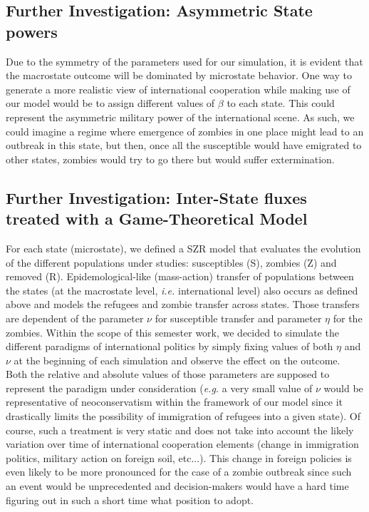 \documentclass[11pt]{article} %
\begin{document}
\subsection{Further Investigation: Asymmetric State powers}\indent

Due to the symmetry of the parameters used for our simulation, it is evident that the macrostate outcome will be dominated by microstate behavior. One way to generate a more realistic view of international cooperation while making use of our model would be to assign different values of $\beta$ to each state. This could represent the asymmetric military power of the international scene. As such, we could imagine a regime where emergence of zombies in one place might lead to an outbreak in this state, but then, once all the susceptible would have emigrated to other states, zombies would try to go there but would suffer extermination.

\subsection{Further Investigation: Inter-State fluxes treated with a Game-Theoretical Model}\indent
\label{sec:gt}

For each state (microstate), we defined a SZR model that evaluates the evolution of the different populations under studies: susceptibles (S), zombies (Z) and removed (R). Epidemological-like (mass-action) transfer of populations between the states (at the macrostate level, \textit{i.e.} international level) also occurs as defined above and models the refugees and zombie transfer across states. Those transfers are dependent of the parameter $\nu$ for susceptible transfer and parameter $\eta$ for the zombies. Within the scope of this semester work, we decided to simulate the different paradigms of international politics by simply fixing values of both $\eta$ and $\nu$ at the beginning of each simulation and observe the effect on the outcome. Both the relative and absolute values of those parameters are supposed to represent the paradigm under consideration (\textit{e.g.} a very small value of $\nu$ would be representative of neoconservatism within the framework of our model since it drastically limits the possibility of immigration of refugees into a given state). Of course, such a treatment is very static and does not take into account the likely variation over time of  international cooperation elements (change in immigration politics, military action on foreign soil, etc...). This change in foreign policies is even likely to be more pronounced for the case of a zombie outbreak since such an event would be unprecedented and decision-makers would have a hard time figuring out in such a short time what position to adopt. 
\end{document}
